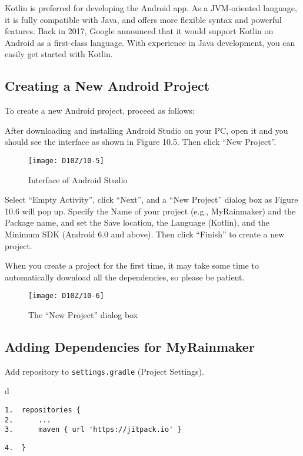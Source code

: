 \documentclass[a4paper,12pt]{book}
\begin{document}
Kotlin is preferred for developing the Android app. As a JVM-oriented language, it is fully compatible with Java, and offers more flexible syntax and powerful features. Back in 2017, Google announced that it would support Kotlin on Android as a first-class language. With experience in Java development, you can easily get started with Kotlin.

\subsection{Creating a New Android Project}
To create a new Android project, proceed as follows:

After downloading and installing Android Studio on your PC, open it and you should see the interface as shown in Figure 10.5. Then click “New Project”.

\begin{figure}[ht]
    \centering
    \texttt{[image: D10Z/10-5]}
    \caption{Interface of Android Studio}
\end{figure}

Select “Empty Activity”, click “Next”, and a “New Project” dialog box as Figure 10.6 will pop up. Specify the Name of your project (e.g., MyRainmaker) and the Package name, and set the Save location, the Language (Kotlin), and the Minimum SDK (Android 6.0 and above). Then click “Finish” to create a new project. 

When you create a project for the first time, it may take some time to automatically download all the dependencies, so please be patient.

\begin{figure}[ht]
    \centering
    \texttt{[image: D10Z/10-6]}
    \caption{The “New Project” dialog box}
\end{figure}

\subsection{Adding Dependencies for MyRainmaker}
Add repository to \verb|settings.gradle| (Project Settings).

\begin{codebloc}
\begin{tabular}{d}
\vspace{2pt}
\begin{verbatim}
1.  repositories {
2.      ...
3.      maven { url 'https://jitpack.io' }
\end{verbatim}
\verb|4.  }|
\end{tabular}
\end{codebloc}
\end{document}

